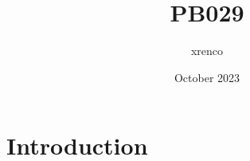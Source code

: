 \documentclass{article}
\title{PB029}
\author{xrenco}
\date{October 2023}
\begin{document}
\maketitle

\section{Introduction}
\end{document}
